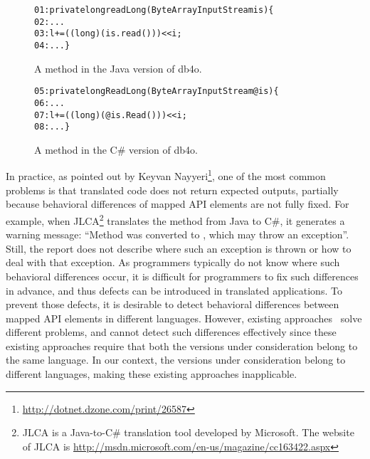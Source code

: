 \begin{figure}[t]
\begin{CodeOut}%
\begin{alltt}
01: private long readLong(ByteArrayInputStream is)\{
02:  ...
03:  l += ((long) (is.read())) << i;
04:  ...\}
\end{alltt}
\end{CodeOut}%
\caption{A method in the Java version of db4o.}%
\label{fig:db4ojava}
\begin{CodeOut}%
\begin{alltt}
05: private long ReadLong(ByteArrayInputStream @is)\{
06:  ...
07:  l += ((long)(@is.Read())) << i;
08:  ...\}
\end{alltt}
\end{CodeOut}%
\caption{A method in the C\# version of db4o.}%
\label{fig:db40net}
\end{figure}

In practice, as pointed out by Keyvan Nayyeri\footnote{\url{http://dotnet.dzone.com/print/26587}}, one of the most common problems is that translated code does not return expected outputs, partially because behavioral differences of mapped API elements are not fully fixed. For example, when JLCA\footnote{JLCA is a Java-to-C\# translation tool developed by Microsoft. The website of JLCA is \url{http://msdn.microsoft.com/en-us/magazine/cc163422.aspx}} translates the  method from Java to C\#, it generates a warning message: ``Method  was converted to , which may throw an exception''. Still, the report does not describe where such an exception is thrown or how to deal with that exception. As programmers typically do not know where such behavioral differences occur, it is difficult for programmers to fix such differences in advance, and thus defects can be introduced in translated applications. To prevent those defects, it is desirable to detect behavioral differences between mapped API elements in different languages. However, existing approaches~\citep{orso1using,jin2010automated,jiang2009automatic,lindigaadebug2005} solve different problems, and cannot detect such differences effectively since these existing approaches require that both the versions under consideration belong to the same language. In our context, the versions under consideration belong to different languages, making these existing approaches inapplicable.


